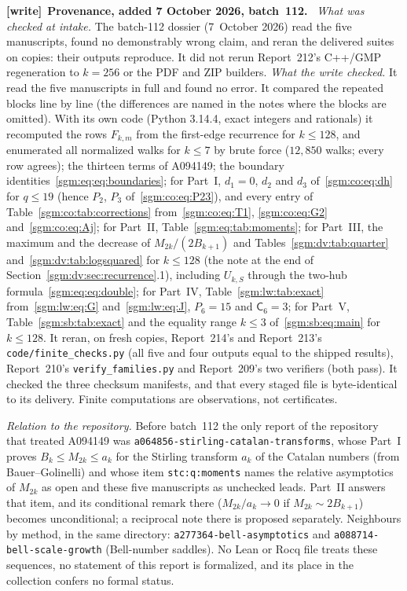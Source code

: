 \documentclass[11pt,letterpaper]{article}
\theoremstyle{remark}\newtheorem{remark}[theorem]{Remark}
\newcommand{\Cgood}{\mathsf C}\DeclareMathOperator{\norm}{norm}
\newcommand{\file}[1]{\nolinkurl{#1}}
\newenvironment{writenote}[1][]{\par\smallskip\begingroup\small
 \noindent\textbf{[write]}\if\relax\detokenize{#1}\relax\else~\textbf{#1.}\fi\ }%
 {\par\endgroup\smallskip}
\theoremstyle{definition}\newtheorem{definition}[theorem]{Definition}
\begin{document}
\begin{writenote}[Provenance, added 7 October 2026, batch~112]
\emph{What was checked at intake.} The batch-112 dossier (7~October 2026)
read the five manuscripts, found no demonstrably wrong claim, and reran the
delivered suites on copies: their outputs reproduce. It did not rerun
Report~212's C++/GMP regeneration to $k=256$ or the PDF and ZIP builders.
\emph{What the write checked.} It read the five manuscripts in full and found
no error. It compared the repeated blocks line by line (the differences are
named in the notes where the blocks are omitted). With its own code (Python
3.14.4, exact integers and rationals) it recomputed the rows $F_{k,m}$ from
the first-edge recurrence for $k\le128$, and enumerated all normalized walks
for $k\le7$ by brute force ($12{,}850$ walks; every row agrees); the thirteen
terms of A094149; the boundary identities~\eqref{sgm:eq:eq:boundaries}; for
Part~I, $d_1=0$, $d_2$ and $d_3$ of~\eqref{sgm:co:eq:dh} for $q\le19$ (hence
$P_2$, $P_3$ of~\eqref{sgm:co:eq:P23}), and every entry of
Table~\ref{sgm:co:tab:corrections} from~\eqref{sgm:co:eq:T1},
\eqref{sgm:co:eq:G2} and~\eqref{sgm:co:eq:Aj}; for Part~II,
Table~\ref{sgm:eq:tab:moments}; for Part~III, the maximum and the decrease
of $M_{2k}/(2B_{k+1})$ and Tables~\ref{sgm:dv:tab:quarter}
and~\ref{sgm:dv:tab:logsquared} for $k\le128$ (the note at the end of
Section~\ref{sgm:dv:sec:recurrence}.1), including $U_{k,S}$ through the
two-hub formula~\eqref{sgm:eq:eq:double}; for Part~IV,
Table~\ref{sgm:lw:tab:exact} from~\eqref{sgm:lw:eq:G}
and~\eqref{sgm:lw:eq:J}, $P_6=15$ and $\Cgood_6=3$; for Part~V,
Table~\ref{sgm:sb:tab:exact} and the equality range $k\le3$ of~\eqref{sgm:sb:eq:main}
for $k\le128$. It reran, on fresh copies, Report~214's and Report~213's
\file{code/finite_checks.py} (all five and four outputs equal to the shipped
results), Report~210's \file{verify_families.py} and Report~209's two
verifiers (both pass). It checked the three checksum manifests, and that
every staged file is byte-identical to its delivery. Finite computations are
observations, not certificates.

\emph{Relation to the repository.} Before batch~112 the only report of the
repository that treated A094149 was
\file{a064856-stirling-catalan-transforms}, whose Part~I proves
$B_k\le M_{2k}\le a_k$ for the Stirling transform $a_k$ of the Catalan
numbers (from Bauer--Golinelli) and whose item \file{stc:q:moments} names the
relative asymptotics of $M_{2k}$ as open and these five manuscripts as
unchecked leads. Part~II answers that item, and its conditional remark there
($M_{2k}/a_k\to0$ if $M_{2k}\sim2B_{k+1}$) becomes unconditional; a reciprocal
note there is proposed separately. Neighbours by method, in the same
directory: \file{a277364-bell-asymptotics} and \file{a088714-bell-scale-growth}
(Bell-number saddles). No Lean or Rocq file treats these sequences, no
statement of this report is formalized, and its place in the collection
confers no formal status.
\end{writenote}
\end{document}
